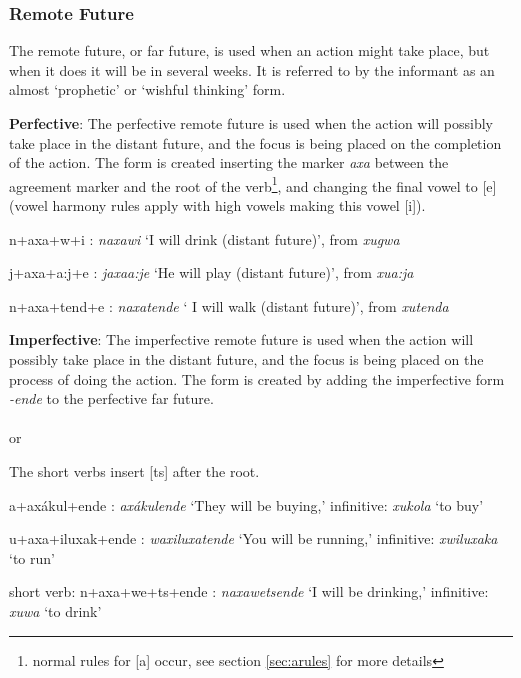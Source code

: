 \subsubsection{Remote Future}
The remote future, or far future, is used when an action might take place, but when it does it will be in several weeks.  It is referred to by the informant as an almost `prophetic' or `wishful thinking' form.

\textbf{Perfective}: The perfective remote future is used when the action will possibly take place in the distant future, and the focus is being placed on the completion of the action.  The form is created inserting the marker \emph{axa} between the agreement marker and the root of the verb\footnote{normal rules for [a] occur, see section \ref{sec:arules} for more details}, and changing the final vowel to [e] (vowel harmony rules apply with high vowels making this vowel [i]).\\

\begin{wrdex}
\item n+axa+\engma{}w+i : \emph{naxa\engma{}wi} `I will drink (distant future)', from \emph{xu\engma{}gwa}
\item j+axa+\beta{}a:j+e : \emph{jaxa\beta{}a:je} `He will play (distant future)', from \emph{xu\beta{}a:ja}
\item n+axa+t\esh{}end+e : \emph{naxat\esh{}end\ezh{}e} ` I will walk (distant future)', from \emph{xut\esh{}enda}
\end{wrdex}

\textbf{Imperfective}: The imperfective remote future is used when the action will possibly take place in the distant future, and the focus is being placed on the process of doing the action.  The form is created by adding the imperfective form \emph{-end\ezh{}e} to the perfective far future.\\
\\
or\\

The short verbs insert [ts] after the root.
\begin{wrdex}
\item \beta{}a+ax\'akul+end\ezh{}e : \emph{\beta{}ax\'akulend\ezh{}e} `They will be buying,' infinitive: \emph{xukola} `to buy'
\item u+axa+iluxak+end\ezh{}e : \emph{waxiluxat\esh{}end\ezh{}e} `You will be running,' infinitive: \emph{xwiluxaka} `to run'
\item short verb: n+axa+\engma{}we+ts+end\ezh{}e : \emph{naxa\engma{}wetsend\ezh{}e} `I will be drinking,' infinitive: \emph{xu\engma{}wa} `to drink'
\end{wrdex}

